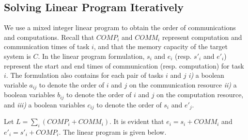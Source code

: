 \documentclass[sigconf]{acmart}
\begin{document}
	
	\subsection{Solving Linear Program Iteratively}
	\label{subsec:linearprogrammingformulation}
	We use a mixed integer linear program to obtain the order of communications and computations. Recall that $COMP_i$ and $COMM_i$ represent computation and communication times of task $i$, and that the memory capacity of the target system is $C$. In the linear program formulation, $s_i$ and $e_i$ (resp. $s'_i$ and $e'_i$) represent the start and end times of communication (resp. computation) for task $i$. The formulation also contains for each pair of tasks $i$ and $j$ \textit{i)} a boolean variable $a_{ij}$ to denote the order of $i$ and $j$ on the communication resource \textit{ii)} a boolean variables $b_{ij}$ to denote the order of $i$ and $j$ on the computation resource, and \textit{iii)} a boolean variables $c_{ij}$ to denote the order of $s_i$ and $e'_j$. 
	
	
	
	
	
	
	\noindent Let $L=\sum_i (COMP_i + COMM_i)$. It is evident that $e_i =s_i + COMM_i$ and $e'_i =s'_i + COMP_i$. The linear program is given below.
	
\end{document}
